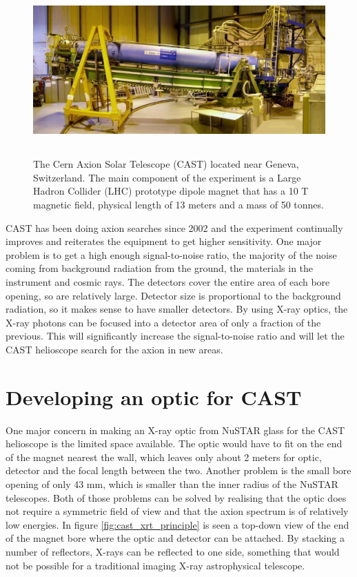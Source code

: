 \begin{figure}[htbp]
  \centering
    \includegraphics[height=6.5cm]{figures/cast/cast_instrument.jpg}
  \caption{\footnotesize The Cern Axion Solar Telescope (CAST) located near Geneva, Switzerland. The main component of the experiment is a Large Hadron Collider (LHC) prototype dipole magnet that has a 10 T magnetic field, physical length of 13 meters and a mass of 50 tonnes.}
  \label{fig:cast_instrument}
\end{figure}

CAST has been doing axion searches since 2002 and the experiment continually improves and reiterates the equipment to get higher sensitivity. One major problem is to get a high enough signal-to-noise ratio, the majority of the noise coming from background radiation from the ground, the materials in the instrument and cosmic rays. The detectors cover the entire area of each bore opening, so are relatively large. Detector size is proportional to the background radiation, so it makes sense to have smaller detectors. By using X-ray optics, the X-ray photons can be focused into a detector area of only a fraction of the previous. This will significantly increase the signal-to-noise ratio and will let the CAST helioscope search for the axion in new areas.

\section{Developing an optic for CAST}
One major concern in making an X-ray optic from NuSTAR glass for the CAST helioscope is the limited space available. The optic would have to fit on the end of the magnet nearest the wall, which leaves only about 2 meters for optic, detector and the focal length between the two. Another problem is the small bore opening of only 43 mm, which is smaller than the inner radius of the NuSTAR telescopes. Both of those problems can be solved by realising that the optic does not require a symmetric field of view and that the axion spectrum is of relatively low energies. In figure \ref{fig:cast_xrt_principle} is seen a top-down view of the end of the magnet bore where the optic and detector can be attached. By stacking a number of reflectors, X-rays can be reflected to one side, something that would not be possible for a traditional imaging X-ray astrophysical telescope.

